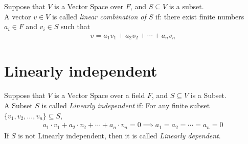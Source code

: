 \newpage

\begin{definition}
    Suppose that $V$ is a Vector Space over $F$, and $S \subseteq V$ is a subset. \\
    A vector $v \in V$ is called \textit{linear combination of $S$} if: 
    there exist finite numbers $a_i \in F$ and $v_i \in S$ such that
    \begin{align*}
        v = a_1 v_1 + a_2 v_2 + \cdots + a_n v_n
    \end{align*}
\end{definition}

\section{Linearly independent}
\begin{definition}
    Suppose that $V$ is a Vector Space over a field $F$, and $S \subseteq V$ is a Subset. \\
    A Subset $S$ is called \textit{Linearly independent} if: For any finite subset $\{v_1, v_2, \ldots, v_n\} \subseteq S$,
    \begin{align*}
        a_1 \cdot v_1 + a_2 \cdot v_2 + \cdots + a_n \cdot v_n = 0 \implies a_1 = a_2 = \cdots = a_n = 0
    \end{align*}
    If $S$ is not Linearly independent, then it is called \textit{Linearly dependent}.
\end{definition}


